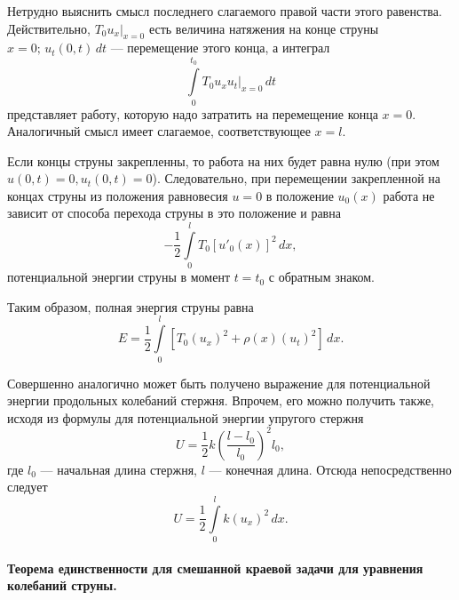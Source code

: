 Нетрудно выяснить смысл последнего слагаемого правой части этого равенства. Действительно, $T_0 u_x|_{x = 0}$ есть величина натяжения на конце струны $x = 0; \, u_t(0, t) \, dt$  --- перемещение этого конца, а интеграл 
\begin{equation}
	\int \limits_{0}^{t_0} T_0 u_x u_t|_{x = 0} \, dt
\end{equation}
представляет работу, которую надо затратить на перемещение конца $x = 0$. Аналогичный смысл имеет слагаемое, соответствующее $x = l$. 

Если концы струны закрепленны, то работа на них будет равна нулю (при этом $u(0, t) = 0, u_t(0, t) = 0$). Следовательно, при перемещении закрепленной на концах струны из положения равновесия $u = 0$ в положение $u_0(x)$ работа не зависит от способа перехода струны в это положение и равна 
\begin{equation}
	-\frac{1}{2} \int \limits_{0}^{l} T_0[u'_0(x)]^2 \, dx, 
\end{equation}
потенциальной энергии струны в момент $t = t_0$ с обратным знаком.

Таким образом, полная энергия струны равна
\begin{equation}
	E = \frac{1}{2} \int \limits_{0}^{l} [T_0(u_x)^2 + \rho(x)(u_t)^2] \, dx.
\end{equation}

Совершенно аналогично может быть получено выражение для потенциальной энергии продольных колебаний стержня. Впрочем, его можно получить также, исходя из формулы для потенциальной энергии упругого стержня
\begin{equation*}
	U = \frac{1}{2} k(\frac{l - l_0}{l_0})^2 l_0,
\end{equation*}
где $l_0$ --- начальная длина стержня, $l$ --- конечная длина. Отсюда непосредственно следует 
\begin{equation*}
	U = \frac{1}{2} \int \limits_{0}^{l} k(u_x)^2 \, dx.
\end{equation*}

\paragraph{Теорема единственности для смешанной краевой задачи для уравнения колебаний струны.}
